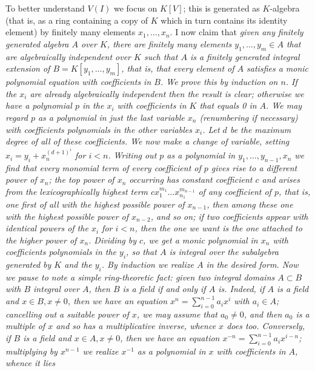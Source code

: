 \documentclass[10pt]{article}
\begin{document}
To better understand $V(I)$ we focus on $K[V]$; this is generated as
$K$-algebra (that is, as a ring containing a copy of $K$ which in turn
contains its identity element) by finitely many elements
$x_1,\ldots,x_n$. I now claim that {}\sl given any finitely generated
algebra $A$ over $K$, there are finitely many elements
$y_1,\ldots,y_m\in A$ that are algebraically independent over $K$ such
that $A$ is a finitely generated integral extension of
$B=K[y_1,\ldots,y_m]$, that is, that every element of $A$ satisfies a
monic polynomial equation with coefficients in $B$. We prove this by
induction on $n$. If the $x_i$ are already algebraically independent
then the result is clear; otherwise we have a polynomial $p$ in the
$x_i$ with coefficients in $K$ that equals 0 in $A$. We may regard $p$
as a polynomial in just the last variable $x_n$ (renumbering if
necessary) with coefficients polynomials in the other variables $x_i$.
Let $d$ be the maximum degree of all of these coefficients. We now make
a change of variable, setting $x_i = y_i + x_n^{(d+1)^i}$ for $i<n$.
Writing out $p$ as a polynomial in $y_1,\ldots,y_{n-1},x_n$ we find that
every monomial term of every coefficient of $p$ gives rise to a
different power of $x_n$; the top power of $x_n$ occurring has constant
coefficient $c$ and arises from the lexicographically highest term
$cx_1^{m_1}\ldots x_{n_1}^{m_{n-1}}$ of any coefficient of $p$, that is,
one first of all with the highest possible power of $x_{n-1}$, then
among these one with the highest possible power of $x_{n-2}$, and so on;
if two coefficients appear with identical powers of the $x_i$ for $i<n$,
then the one we want is the one attached to the higher power of $x_n$.
Dividing by $c$, we get a monic polynomial in $x_n$ with coefficients
polynomials in the $y_i$, so that $A$ is integral over the subalgebra
generated by $K$ and the $y_i$. By induction we realize $A$ in the
desired form. Now we pause to note a simple ring-theoretic fact: {\sl
  given two integral domains $A\subset B$ with $B$ integral over $A$,
  then $B$ is a field if and only if $A$ is}. Indeed, if $A$ is a field
and $x\in B,x\ne0$, then we have an equation $x^n = \sum_{i=0}^{n-1} a_i
x^i$ with $a_i\in A$; cancelling out a suitable power of $x$, we may
assume that $a_0\ne0$, and then $a_0$ is a multiple of $x$ and so has a
multiplicative inverse, whence $x$ does too. Conversely, if $B$ is a
field and $x\in A,x\ne0$, then we have an equation $x^{-n} =
\sum_{i=0}^{n-1} a_i x^{i-n}$; multiplying by $x^{n-1}$ we realize
$x^{-1}$ as a polynomial in $x$ with coefficients in $A$, whence it lies
\end{document}
